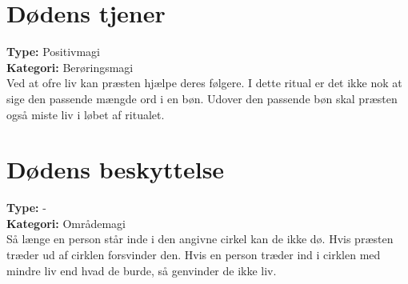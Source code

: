 \section*{Dødens tjener}
\textbf{Type:} Positivmagi\\ 
\textbf{Kategori:} Berøringsmagi\\
Ved at ofre liv kan præsten hjælpe deres følgere. I dette ritual er det ikke nok at sige den passende mængde ord i en bøn. Udover den passende bøn skal præsten også miste liv i løbet af ritualet.\\

\section*{Dødens beskyttelse}
\textbf{Type:} - \\
\textbf{Kategori:} Områdemagi\\
Så længe en person står inde i den angivne cirkel kan de ikke dø. Hvis præsten træder ud af cirklen forsvinder den. Hvis en person træder ind i cirklen med mindre liv end hvad de burde, så genvinder de ikke liv.

